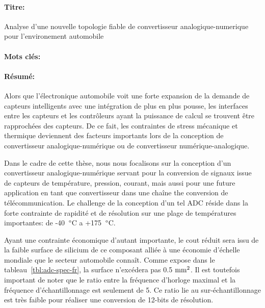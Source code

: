 \begin{mdframed}[linecolor=Prune,linewidth=1]
\vspace{-.25cm}
\paragraph*{Titre:} 
Analyse d'une nouvelle topologie fiable de convertisseur analogique-numerique pour \newline l'environement automobile
\vspace{-.25cm}
\paragraph*{Mots clés:} 

\vspace{-.5cm}
\paragraph*{Résumé:} 
Alors que l'électronique automobile voit une forte expansion de la demande de capteurs intelligents avec une intégration de plus en plus pousse, les interfaces entre les capteurs et les contrôleurs ayant la puissance de calcul se trouvent être rapprochées des capteurs. De ce fait, les contraintes de stress mécanique et thermique deviennent des facteurs importants lors de la conception de convertisseur analogique-numérique ou de convertisseur numérique-analogique.

Dans le cadre de cette thèse, nous nous focalisons sur la conception d'un convertisseur analogique-numérique servant pour la conversion de signaux issue de capteurs de température, pression, courant, mais aussi pour une future application en tant que convertisseur dans une chaîne the conversion de télécommunication. Le challenge de la conception d'un tel ADC réside dans la forte contrainte de rapidité et de résolution sur une plage de températures importantes: de -40 $\degree$C a +175 $\degree$C.

Ayant une contrainte économique d’autant importante, le cout réduit sera issu de la faible surface de silicium de ce composant alliée à une économie d’échelle mondiale que le secteur automobile connaît. Comme expose dans le tableau~\ref{tbl:adc-spec-fr}, la surface n’excédera pas 0.5 $\rm mm^2$. Il est toutefois important de noter que le ratio entre la fréquence d'horloge maximal et la fréquence d'échantillonnage est seulement de 5. Ce ratio lie au sur-échantillonnage est très faible pour réaliser une conversion de 12-bits de résolution.


\end{mdframed}
